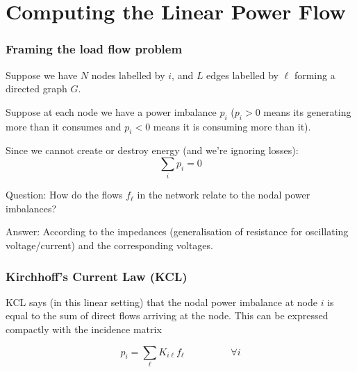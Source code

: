 \documentclass[10pt,dvipsnames]{beamer}
\begin{document}
\section{Computing the Linear Power Flow}

\begin{frame}
  \frametitle{Framing the load flow problem}

  Suppose we have $N$ nodes labelled by $i$, and $L$ edges labelled by
  $\ell$ forming a directed graph $G$.

  Suppose at each node we have a \alert{power imbalance} $p_i$ ($p_i >
  0$ means its generating more than it consumes and $p_i < 0$ means it
  is consuming more than it).

  Since we cannot create or destroy energy (and we're ignoring losses):
  \begin{equation*}
    \sum_i p_i = 0
  \end{equation*}

  \alert{Question}: How do the flows $f_\ell$ in the network relate to the nodal power
  imbalances?

  \alert{Answer}: According to the impedances (generalisation of
  resistance for oscillating voltage/current) and the corresponding
  voltages.

\end{frame}



\begin{frame}
  \frametitle{Kirchhoff's Current Law (KCL)}

  KCL says (in this linear setting) that the nodal power imbalance at
  node $i$ is equal to the sum of direct flows arriving at the
  node. This can be expressed compactly with the incidence matrix

  \begin{equation*}
    p_i = \sum_\ell K_{i\ell} f_\ell \hspace{2cm} \forall i
  \end{equation*}


\end{frame}
\end{document}
